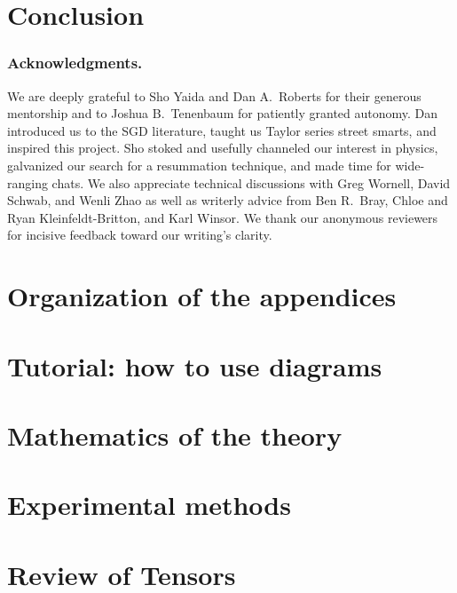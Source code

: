    \section{Conclusion}
        

    \newpage
    \subsubsection{Acknowledgments.}
        We are deeply grateful to Sho Yaida and Dan A.\ Roberts for their
        generous mentorship and to Joshua B.\ Tenenbaum for patiently
        granted autonomy.  Dan introduced us to the SGD literature, taught us
        Taylor series street smarts, and inspired this project.  Sho stoked and
        usefully channeled our interest in physics, galvanized our search for a
        resummation technique, and made time for wide-ranging chats.  We also
        appreciate technical discussions with Greg Wornell, David Schwab, and
        Wenli Zhao as well as writerly advice from Ben R.\ Bray, Chloe and Ryan
        Kleinfeldt-Britton, and Karl Winsor.
        We thank our anonymous reviewers for incisive feedback toward our
        writing's clarity.
    
    
    
    \appendix

    \newpage
    \section*{Organization of the appendices}
        

    \newpage
    \section{Tutorial: how to use diagrams}\label{appendix:tutorial}
        
    
    \newpage
    \section{Mathematics of the theory}\label{appendix:math}
        
    
    \newpage
    \section{Experimental methods}\label{appendix:experiments}
        
    
    \newpage
    \section{Review of Tensors}
        


